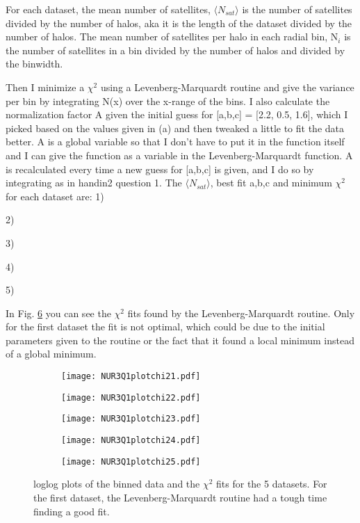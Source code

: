 For each dataset, the mean number of satellites, $\langle N_{sat} \rangle$ is the number of satellites divided by
the number of halos, aka it is the length of the dataset divided by the number of halos. 
The mean number of satellites per halo in each radial bin, N$_i$ is the number of satellites in a bin divided by
the number of halos and divided by the binwidth. 

Then I minimize a $\chi^2$ using a Levenberg-Marquardt routine and give the variance per bin by integrating N(x) 
over the x-range of the bins. I also calculate the normalization factor A given the initial guess for [a,b,c] =
[2.2, 0.5, 1.6], which I picked based on the values given in (a) and then tweaked a little to fit the data better.
A is a global variable so that I don't have to put it in the function itself and I can give the function as a variable
in the Levenberg-Marquardt function. A is recalculated every time a new guess for [a,b,c] is given, and I do so
by integrating as in handin2 question 1. 
The $\langle N_{sat} \rangle$, best fit a,b,c and minimum $\chi^2$ for each dataset are: 1)

2)

3)

4)

5)


In Fig. \ref{fig:fig2} you can see the $\chi^2$ fits found by the Levenberg-Marquardt routine. Only for the first dataset the fit is not optimal, which could be due to the initial parameters given to the routine or the fact that it found a local minimum instead of a global minimum. 

\begin{figure}[ht]
    \begin{subfigure}{.49\textwidth}
       \centering
    \texttt{[image: NUR3Q1plotchi21.pdf]}
    \centering
    \subcaption{}
    \label{}
    \end{subfigure}
    \hfill
    \begin{subfigure}{.49\textwidth}
       \centering
    \texttt{[image: NUR3Q1plotchi22.pdf]}
    \centering
    \subcaption{}
    \label{}
    \end{subfigure}
     \begin{subfigure}{.49\textwidth}
       \centering
    \texttt{[image: NUR3Q1plotchi23.pdf]}
    \centering
    \subcaption{}
    \label{}
    \end{subfigure}
     \begin{subfigure}{.49\textwidth}
       \centering
    \texttt{[image: NUR3Q1plotchi24.pdf]}
    \centering
    \subcaption{}
    \label{}
    \end{subfigure}
     \begin{subfigure}{.49\textwidth}
       \centering
    \texttt{[image: NUR3Q1plotchi25.pdf]}
    \centering
    \subcaption{}
    \label{}
    \end{subfigure}
    \caption{loglog plots of the binned data and the $\chi^2$ fits for the 5 datasets. For the first dataset, the Levenberg-Marquardt routine had a tough time finding a good fit.}
    \label{fig:fig2}
\end{figure}


